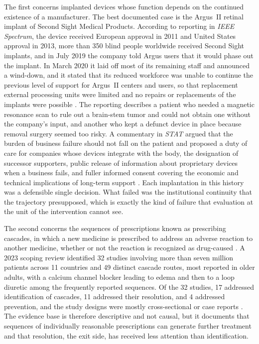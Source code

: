 \documentclass[11pt]{article}
\theoremstyle{plain}
\theoremstyle{definition}
\theoremstyle{remark}
\begin{document}
The first concerns implanted devices whose function depends on the continued existence of a manufacturer. The best documented case is the Argus~II retinal implant of Second Sight Medical Products. According to reporting in \emph{IEEE Spectrum}, the device received European approval in 2011 and United States approval in 2013, more than 350 blind people worldwide received Second Sight implants, and in July 2019 the company told Argus users that it would phase out the implant. In March 2020 it laid off most of its remaining staff and announced a wind-down, and it stated that its reduced workforce was unable to continue the previous level of support for Argus~II centers and users, so that replacement external processing units were limited and no repairs or replacements of the implants were possible \cite{spectrum2022}. The reporting describes a patient who needed a magnetic resonance scan to rule out a brain-stem tumor and could not obtain one without the company's input, and another who kept a defunct device in place because removal surgery seemed too risky. A commentary in \emph{STAT} argued that the burden of business failure should not fall on the patient and proposed a duty of care for companies whose devices integrate with the body, the designation of successor supporters, public release of information about proprietary devices when a business fails, and fuller informed consent covering the economic and technical implications of long-term support \cite{jazwinska2022}. Each implantation in this history was a defensible single decision. What failed was the institutional continuity that the trajectory presupposed, which is exactly the kind of failure that evaluation at the unit of the intervention cannot see.

The second concerns the sequences of prescriptions known as prescribing cascades, in which a new medicine is prescribed to address an adverse reaction to another medicine, whether or not the reaction is recognized as drug-caused \cite{rochon1997,chen2023}. A 2023 scoping review identified 32 studies involving more than seven million patients across 11 countries and 49 distinct cascade routes, most reported in older adults, with a calcium channel blocker leading to edema and then to a loop diuretic among the frequently reported sequences. Of the 32 studies, 17 addressed identification of cascades, 11 addressed their resolution, and 4 addressed prevention, and the study designs were mostly cross-sectional or case reports \cite{chen2023}. The evidence base is therefore descriptive and not causal, but it documents that sequences of individually reasonable prescriptions can generate further treatment and that resolution, the exit side, has received less attention than identification.
\end{document}
